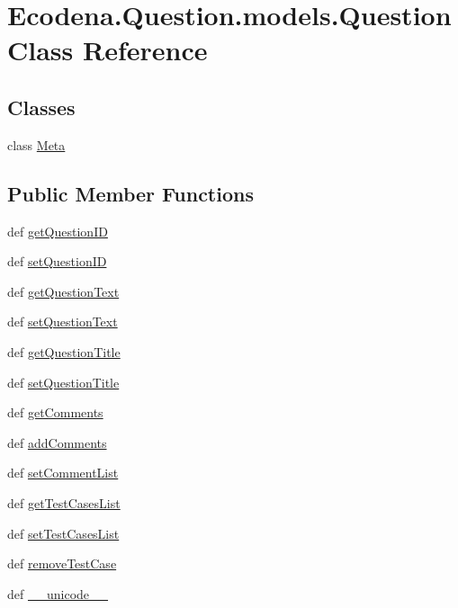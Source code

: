 \hypertarget{class_ecodena_1_1_question_1_1models_1_1_question}{
\section{Ecodena.Question.models.Question Class Reference}
\label{d1/d67/class_ecodena_1_1_question_1_1models_1_1_question}
}
\subsection*{Classes}
\begin{DoxyCompactItemize}
\item 
class \hyperlink{class_ecodena_1_1_question_1_1models_1_1_question_1_1_meta}{Meta}
\end{DoxyCompactItemize}
\subsection*{Public Member Functions}
\begin{DoxyCompactItemize}
\item 
def \hyperlink{class_ecodena_1_1_question_1_1models_1_1_question_adc92e0f2f7ec665f56753d41b89a7d94}{getQuestionID}
\item 
def \hyperlink{class_ecodena_1_1_question_1_1models_1_1_question_ad22fc6d68a461c6ef58fb1b51ab66b71}{setQuestionID}
\item 
def \hyperlink{class_ecodena_1_1_question_1_1models_1_1_question_ab2c1e4c10f5c18173a07bad1ca640af4}{getQuestionText}
\item 
def \hyperlink{class_ecodena_1_1_question_1_1models_1_1_question_a53b5f7e6e0bc51fac1994acab5c77712}{setQuestionText}
\item 
def \hyperlink{class_ecodena_1_1_question_1_1models_1_1_question_af3fde7d84e02153cd692d75c076db926}{getQuestionTitle}
\item 
def \hyperlink{class_ecodena_1_1_question_1_1models_1_1_question_a0a97a9adf718cbc7899766d6afe37001}{setQuestionTitle}
\item 
def \hyperlink{class_ecodena_1_1_question_1_1models_1_1_question_a031f45ef6b6ce7c6bdeb7831de19a9cb}{getComments}
\item 
def \hyperlink{class_ecodena_1_1_question_1_1models_1_1_question_a420320045300430abd31d5382599324b}{addComments}
\item 
def \hyperlink{class_ecodena_1_1_question_1_1models_1_1_question_a25ad9636f3d99e1f19444084e0768e19}{setCommentList}
\item 
def \hyperlink{class_ecodena_1_1_question_1_1models_1_1_question_a1bba84d55138e08d45c3900a866f49d0}{getTestCasesList}
\item 
def \hyperlink{class_ecodena_1_1_question_1_1models_1_1_question_a5a19171b06607c37340c2140d2b84a7c}{setTestCasesList}
\item 
def \hyperlink{class_ecodena_1_1_question_1_1models_1_1_question_a9c861fe9113bfca420e24443662084b8}{removeTestCase}
\item 
def \hyperlink{class_ecodena_1_1_question_1_1models_1_1_question_ab1fd04fd6c3efa197a0cb0f3d1913c37}{\_\-\_\-unicode\_\-\_\-}
\end{DoxyCompactItemize}
